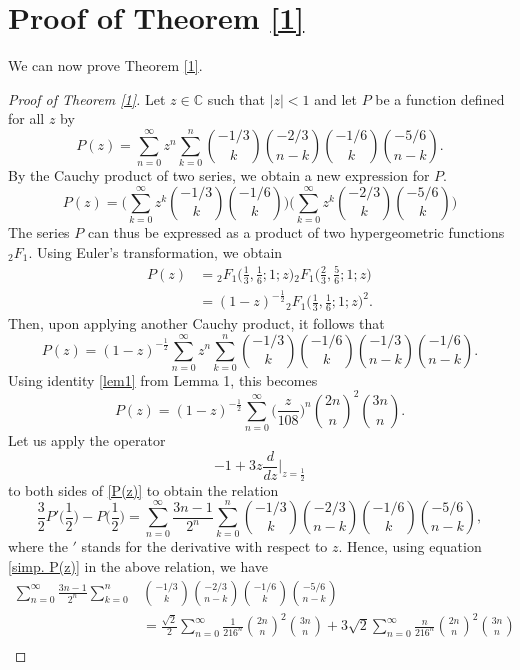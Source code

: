 \documentclass{amsart}
\numberwithin{equation}{section}
\newcommand{\C}{\mathbb C}
\begin{document}
\section{Proof of Theorem \ref{1}}

We can now prove Theorem \ref{1}.

\begin{proof}[Proof of Theorem \ref{1}]
Let $z\in\C$ such that $|z|<1$ and let $P$ be a function defined for all $z$ by
    \begin{equation}
    P(z)=\sum_{n=0}^\infty z^n\sum_{k=0}^n\binom{-1/3}{k}\binom{-2/3}{n-k}\binom{-1/6}{k}\binom{-5/6}{n-k}.
    \label{P(z)}
    \end{equation}
    By the Cauchy product of two series, we obtain a new expression for $P$.
    \[P(z)=\Biggr(\sum_{k=0}^\infty z^k\binom{-1/3}{k}\binom{-1/6}{k}\Biggl)\Biggl(\sum_{k=0}^\infty z^k\binom{-2/3}{k}\binom{-5/6}{k}\Biggr)\]
    The series $P$ can thus be expressed as a product of two hypergeometric functions ${}_2F_1$. Using Euler's transformation, we obtain
    \begin{align*}
        P(z)&={}_2F_1\biggl(\frac13,\frac16;1;z\biggr){}_2F_1\biggl(\frac23,\frac56;1;z\biggr)\\
        &=(1-z)^{-\frac12}{}_2F_1\biggl(\frac13,\frac16;1;z\biggr)^2.
    \end{align*}
    Then, upon applying another Cauchy product, it follows that
\[
P(z) = (1-z)^{-\frac12} \sum_{n=0}^\infty z^n \sum_{k=0}^n \binom{-1/3}{k} \binom{-1/6}{k} \binom{-1/3}{n-k} \binom{-1/6}{n-k}.
\]
Using identity \eqref{lem1} from Lemma 1, this becomes
    \begin{equation}
    P(z)=(1-z)^{-\frac12}\sum_{n=0}^\infty \biggl(\frac{z}{108}\biggr)^n\binom{2n}{n}^2\binom{3n}{n}.
    \label{simp. P(z)}
    \end{equation}
    Let us apply the operator
    \[-1+3z\frac{d}{dz}\Bigg|_{z=\frac12}\]
    to both sides of \eqref{P(z)} to obtain the relation
\[
\frac{3}{2} P'\biggl(\frac12\biggr) - P\biggl(\frac12\biggr) = \sum_{n=0}^\infty \frac{3n-1}{2^n} \sum_{k=0}^n \binom{-1/3}{k} \binom{-2/3}{n-k} \binom{-1/6}{k} \binom{-5/6}{n-k},
\]
where the $'$ stands for the derivative with respect to $z$. Hence, using equation \eqref{simp. P(z)} in the above relation, we have
    \begin{align*}
        \sum_{n=0}^\infty \frac{3n-1}{2^n}\sum_{k=0}^n&\binom{-1/3}{k}\binom{-2/3}{n-k}\binom{-1/6}{k}\binom{-5/6}{n-k}\\
        &=\frac{\sqrt{2}}{2}\sum_{n=0}^\infty \frac{1}{216^n}\binom{2n}{n}^2\binom{3n}{n}+3\sqrt2\sum_{n=0}^\infty \frac{n}{216^n}\binom{2n}{n}^2\binom{3n}{n}\\

\end{align*}
\end{proof}
\end{document}
